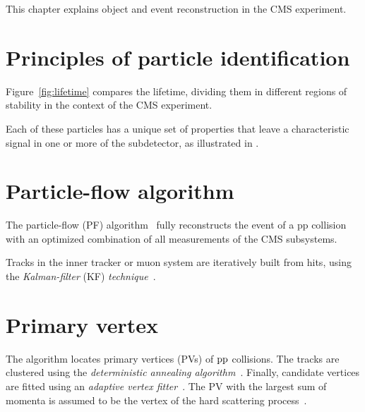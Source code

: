 
 \label{sec:objects}

This chapter explains object and event reconstruction in the CMS experiment.


\section{Principles of particle identification} \label{sec:PID}





Figure~\ref{fig:lifetime} compares the lifetime, dividing them in different regions of stability in the context of the CMS experiment.

Each of these particles has a unique set of properties that leave a characteristic signal in one or more of the subdetector, as illustrated in .


\section{Particle-flow algorithm} \label{sec:PF}
The particle-flow (PF) algorithm~\cite{PF1,PF2017} fully reconstructs the event of a pp collision with an optimized combination of all measurements of the CMS subsystems.

Tracks in the inner tracker or muon system are iteratively built from hits, using the \emph{Kalman-filter} (KF) \emph{technique}~\cite{CMS_track_reco_2006,Kalman_filtering}.


\section{Primary vertex} \label{sec:PV}
The algorithm locates primary vertices (PVs) of $\mathrm{p}\mathrm{p}$ collisions.
The tracks are clustered using the \emph{deterministic annealing algorithm}~\cite{deterministic_annealing}.
Finally, candidate vertices are fitted using an \emph{adaptive vertex fitter}~\cite{vertex_fitting}.
The PV with the largest sum of momenta is assumed to be the vertex of the hard scattering process~\cite{CMS_vertex,PF2017,CMS_vertex_phase2}.



